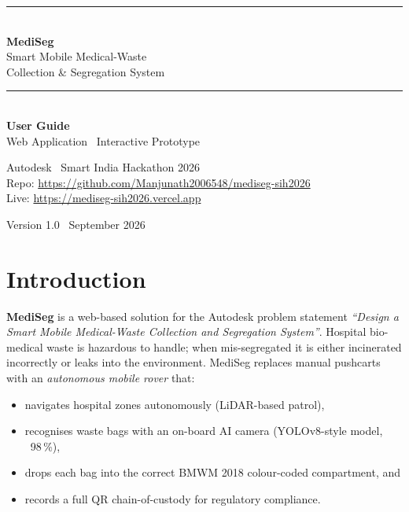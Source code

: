 \documentclass[11pt, a4paper]{article}
\begin{document}
\begin{titlepage}
\centering
\vspace*{2.5cm}

{\color{teal!50!white}\rule{\textwidth}{1pt}}\\[0.8em]
{\Huge\bfseries\textcolor{mediseg}{MediSeg}}\\[0.5em]
{\LARGE Smart Mobile Medical-Waste\\[0.3em] Collection \& Segregation System}\\[1.2em]
{\color{teal!50!white}\rule{\textwidth}{1pt}}\\[2.5em]

{\large \textbf{User Guide}}\\[1.2em]
{\large Web Application \textperiodcentered\ Interactive Prototype}\\[3em]

\begin{minipage}{0.75\textwidth}
\centering
\small
Autodesk \textperiodcentered\ Smart India Hackathon 2026\\
Repo: \url{https://github.com/Manjunath2006548/mediseg-sih2026}\\
Live: \url{https://mediseg-sih2026.vercel.app}
\end{minipage}

\vfill
{\small Version 1.0 \textperiodcentered\ September 2026}
\end{titlepage}

\tableofcontents
\clearpage

\section{Introduction}

\textbf{MediSeg} is a web-based solution for the Autodesk problem statement
\textit{``Design a Smart Mobile Medical-Waste Collection and Segregation System''}.
Hospital bio-medical waste is hazardous to handle; when mis-segregated it is
either incinerated incorrectly or leaks into the environment. MediSeg replaces
manual pushcarts with an \emph{autonomous mobile rover} that:

\begin{itemize}[leftmargin=1.6em, itemsep=2pt]
  \item navigates hospital zones autonomously (LiDAR-based patrol),
  \item recognises waste bags with an on-board AI camera (YOLOv8-style model, ~98\,\%),
  \item drops each bag into the correct BMWM 2018 colour-coded compartment, and
  \item records a full QR chain-of-custody for regulatory compliance.
\end{itemize}
\end{document}

